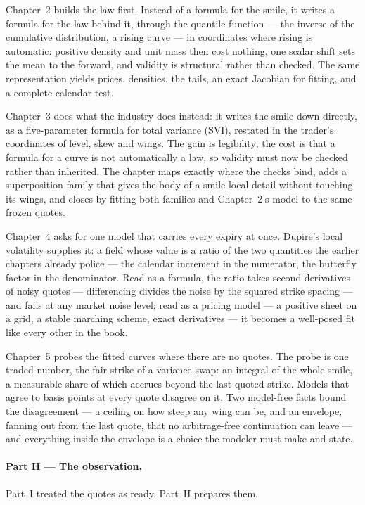 Chapter~2 builds the law first.  Instead of a formula for the
smile, it writes a formula for the law behind it, through the
quantile function --- the inverse of the cumulative distribution, a
rising curve --- in coordinates where rising is automatic: positive
density and unit mass then cost nothing, one scalar shift sets the
mean to the forward, and validity is structural rather than checked.
The same representation yields prices, densities, the tails, an
exact Jacobian for fitting, and a complete calendar test.

Chapter~3 does what the industry does instead: it writes the smile
down directly, as a five-parameter formula for total variance (SVI),
restated in the trader's coordinates of level, skew and wings.  The
gain is legibility; the cost is that a formula for a curve is not
automatically a law, so validity must now be checked rather than
inherited.  The chapter maps exactly where the checks bind, adds a
superposition family that gives the body of a smile local detail
without touching its wings, and closes by fitting both families and
Chapter~2's model to the same frozen quotes.

Chapter~4 asks for one model that carries every expiry at once.
Dupire's local volatility supplies it: a field whose value is a
ratio of the two quantities the earlier chapters already police ---
the calendar increment in the numerator, the butterfly factor in
the denominator.  Read as a
formula, the ratio takes second derivatives of noisy quotes ---
differencing divides the noise by the squared strike spacing ---
and fails at any market noise level; read as a pricing model --- a
positive sheet on a grid, a stable marching scheme, exact
derivatives --- it becomes a well-posed fit like every other in the
book.

Chapter~5 probes the fitted curves where there are no quotes.  The
probe is one traded number, the fair strike of a variance swap: an
integral of the whole smile, a measurable share of which accrues
beyond the last quoted strike.  Models that agree to basis points at
every quote disagree on it.  Two model-free facts bound the
disagreement --- a ceiling on how steep any wing can be, and an
envelope, fanning out from the last quote, that no arbitrage-free
continuation can leave --- and everything inside the envelope is a
choice the modeler must make and state.

\paragraph{Part II --- The observation.}
Part~I treated the quotes as ready.  Part~II prepares them.

